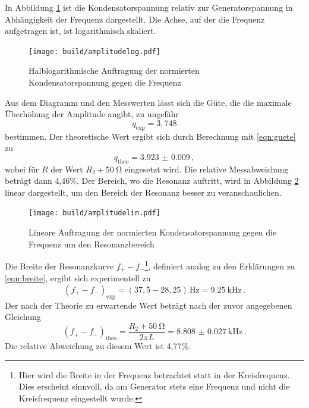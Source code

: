 In Abbildung \ref{fig:amplitudelog} ist die Kondensatorspannung relativ
zur Generatorspannung in Abhängigkeit der Frequenz dargestellt. Die Achse, auf der
die Frequenz aufgetragen ist, ist logarithmisch skaliert.

\begin{figure}
  \centering
  \texttt{[image: build/amplitudelog.pdf]}
  \caption{Halblogarithmische Auftragung der normierten Kondensatorspannung gegen die Frequenz}
  \label{fig:amplitudelog}
\end{figure}

Aus dem Diagramm und den Messwerten lässt sich die Güte, die die maximale
Überhöhung der Amplitude angibt, zu ungefähr
\begin{equation*}
  q_\text{exp} = 3,748
\end{equation*}
bestimmen. Der theoretische Wert ergibt sich durch Berechnung mit \eqref{eqn:guete}
zu
\begin{equation*}
  q_\text{theo} = \SI{3.923(0009)}\,,
\end{equation*}
wobei für $R$ der Wert $R_2+\SI{50}{\ohm}$ eingesetzt wird.
Die relative Messabweichung beträgt dann 4,46\%.
Der Bereich, wo die Resonanz auftritt, wird in Abbildung \ref{fig:amplitudelin}
linear dargestellt, um den Bereich der Resonanz besser zu veranschaulichen.

\begin{figure}
  \centering
  \texttt{[image: build/amplitudelin.pdf]}
  \caption{Lineare Auftragung der normierten Kondensatorspannung gegen die Frequenz um den Resonanzbereich}
  \label{fig:amplitudelin}
\end{figure}

Die Breite der Resonanzkurve $f_{+} - f_{-}$\footnote{Hier wird die Breite in der
Frequenz betrachtet statt in der Kreisfrequenz. Dies erscheint sinnvoll, da am
Generator stets eine Frequenz und nicht die Kreisfrequenz eingestellt wurde.},
definiert analog zu den Erklärungen zu \eqref{eqn:breite}, ergibt sich experimentell zu
\begin{equation*}
  (f_{+} - f_{-})_\text{exp} = (37,5-28,25)\,\text{Hz} = \SI{9.25}{\kilo\hertz}\,.
\end{equation*}
Der nach der Theorie zu erwartende Wert beträgt nach der zuvor angegebenen Gleichung
\begin{equation*}
  (f_{+} - f_{-})_\text{theo} = \frac{R_2+\SI{50}{\ohm}}{2\pi L} = \SI{8.808(27)}{\kilo\hertz}\,.
\end{equation*}
Die relative Abweichung zu diesem Wert ist 4,77\%.

